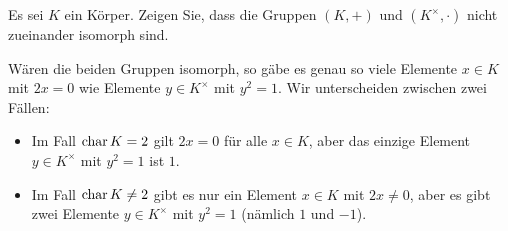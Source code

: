 \begin{question}
  Es sei $K$ ein Körper.
  Zeigen Sie, dass die Gruppen $(K,+)$ und $(K^\times, \cdot)$ nicht zueinander isomorph sind.
\end{question}


\begin{solution}
  Wären die beiden Gruppen isomorph, so gäbe es genau so viele Elemente $x \in K$ mit $2x = 0$ wie Elemente $y \in K^\times$ mit $y^2 = 1$.
  Wir unterscheiden zwischen zwei Fällen:
  \begin{itemize}
    \item 
      Im Fall $\operatorname{char} K = 2$ gilt $2x = 0$ für alle $x \in K$, aber das einzige Element $y \in K^\times$ mit $y^2 = 1$ ist $1$.
    \item
      Im Fall $\operatorname{char} K \neq 2$ gibt es nur ein Element $x \in K$ mit $2x \neq 0$, aber es gibt zwei Elemente $y \in K^\times$ mit $y^2 = 1$ (nämlich $1$ und $-1$).
  \end{itemize}
\end{solution}


